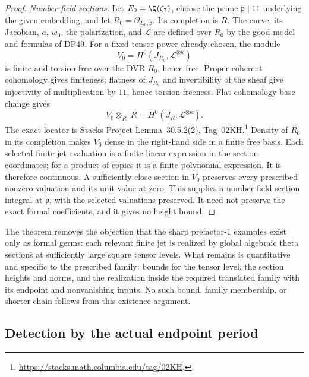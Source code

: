 \documentclass[11pt,a4paper]{article}
\theoremstyle{definition}\newtheorem{remark}[theorem]{Remark}
\begin{document}
\begin{proof}
\emph{Number-field sections.}
Let $E_0=\Q(\zeta_7)$, choose the prime $\mathfrak p\mid11$ underlying the given embedding, and let $R_0=\mathcal O_{E_0,\mathfrak p}$. Its completion is $R$.
The curve, its Jacobian, $a$, $w_0$, the polarization, and $\mathcal L$ are defined over $R_0$ by the good model and formulas of DP49.
For a fixed tensor power already chosen, the module
\[
 V_0=H^0(J_{R_0},\mathcal L^{\otimes\kappa})
\]
is finite and torsion-free over the DVR $R_0$, hence free. Proper coherent cohomology gives finiteness; flatness of $J_{R_0}$ and invertibility of the sheaf give injectivity of multiplication by $11$, hence torsion-freeness.
Flat cohomology base change gives
\[
 V_0\otimes_{R_0}R
 =H^0(J_R,\mathcal L^{\otimes\kappa}).
\]
The exact locator is Stacks Project Lemma~30.5.2(2), Tag~02KH.\footnote{\url{https://stacks.math.columbia.edu/tag/02KH}.}
Density of $R_0$ in its completion makes $V_0$ dense in the right-hand side in a finite free basis. Each selected finite jet evaluation is a finite linear expression in the section coordinates; for a product of copies it is a finite polynomial expression. It is therefore continuous. A sufficiently close section in $V_0$ preserves every prescribed nonzero valuation and its unit value at zero.
This supplies a number-field section integral at $\mathfrak p$, with the selected valuations preserved. It need not preserve the exact formal coefficients, and it gives no height bound.
\end{proof}

The theorem removes the objection that the sharp prefactor-$1$ examples exist only as formal germs: each relevant finite jet is realized by global algebraic theta sections at sufficiently large square tensor levels. What remains is quantitative and specific to the prescribed family: bounds for the tensor level, the section heights and norms, and the realization inside the required translated family with its endpoint and nonvanishing inputs. No such bound, family membership, or shorter chain follows from this existence argument.


\subsection{Detection by the actual endpoint period}
\end{document}
